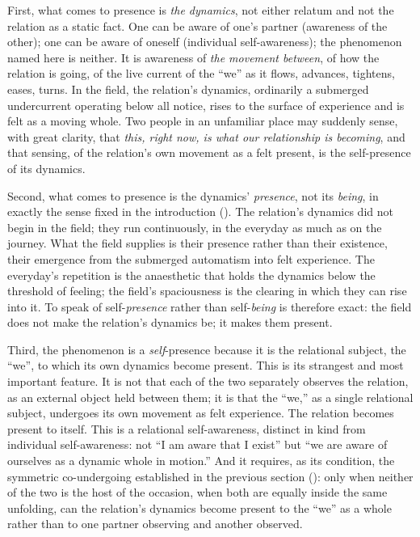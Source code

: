First, what comes to presence is \emph{the dynamics}, not either relatum and not the relation as a static fact. One can be aware of one's partner (awareness of the other); one can be aware of oneself (individual self-awareness); the phenomenon named here is neither. It is awareness of \emph{the movement between}, of how the relation is going, of the live current of the ``we'' as it flows, advances, tightens, eases, turns. In the field, the relation's dynamics, ordinarily a submerged undercurrent operating below all notice, rises to the surface of experience and is felt as a moving whole. Two people in an unfamiliar place may suddenly sense, with great clarity, that \emph{this, right now, is what our relationship is becoming}, and that sensing, of the relation's own movement as a felt present, is the self-presence of its dynamics.

Second, what comes to presence is the dynamics' \emph{presence}, not its \emph{being}, in exactly the sense fixed in the introduction (). The relation's dynamics did not begin in the field; they run continuously, in the everyday as much as on the journey. What the field supplies is their presence rather than their existence, their emergence from the submerged automatism into felt experience. The everyday's repetition is the anaesthetic that holds the dynamics below the threshold of feeling; the field's spaciousness is the clearing in which they can rise into it. To speak of self-\emph{presence} rather than self-\emph{being} is therefore exact: the field does not make the relation's dynamics be; it makes them present.

Third, the phenomenon is a \emph{self}-presence because it is the relational subject, the ``we'', to which its own dynamics become present. This is its strangest and most important feature. It is not that each of the two separately observes the relation, as an external object held between them; it is that the ``we,'' as a single relational subject, undergoes its own movement as felt experience. The relation becomes present to itself. This is a relational self-awareness, distinct in kind from individual self-awareness: not ``I am aware that I exist'' but ``we are aware of ourselves as a dynamic whole in motion.'' And it requires, as its condition, the symmetric co-undergoing established in the previous section (): only when neither of the two is the host of the occasion, when both are equally inside the same unfolding, can the relation's dynamics become present to the ``we'' as a whole rather than to one partner observing and another observed.

